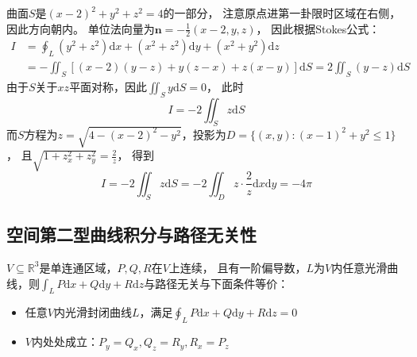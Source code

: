 \begin{solution}
  曲面$S$是$(x-2)^2 + y^2 + z^2 = 4$的一部分，
  注意原点进第一卦限时区域在右侧，因此方向朝内。
  单位法向量为$\mathbf{n} = - \frac{1}{2}(x - 2,y, z)$，
  因此根据Stokes公式：
  \begin{align*}
    I &= \oint_L(y^2 + z^2)\mathrm{d} x + (x^2 + z^2)\mathrm{d} y + (x^2 + y^2)\mathrm{d}z\\
    &= - \iint_S [(x-2)(y-z) + y(z-x) + z(x-y)]\mathrm{d}S = 2 \iint_S (y - z)\mathrm{d} S
  \end{align*}
  由于$S$关于$xz$平面对称，因此$\iint_S y\mathrm{d}S = 0$，
  此时
  \begin{equation*}
    I = -2 \iint_S z \mathrm{d}S
  \end{equation*}
  而$S$方程为$z = \sqrt{4 - (x - 2)^2 - y^2}$，投影为$D = \{(x,y): (x-1)^2 + y^2 \leq 1\}$，
  且$\sqrt{1 + z_x^2 + z_y^2 } = \frac{2}{z}$，
  得到
  \begin{equation*}
    I = -2 \iint_S z\mathrm{d}S = -2 \iint_D z \cdot \frac{2}{z} \mathrm{d}x \mathrm{d} y = -4\pi
  \end{equation*}
\end{solution}



\subsection{空间第二型曲线积分与路径无关性}

\begin{theorem}[空间第二型曲线积分与路径无关性]
  $V \subseteq \mathbb{R}^3$是单连通区域，$P,Q,R$在$V$上连续，
  且有一阶偏导数，$L$为$V$内任意光滑曲线，则$\int_L P\mathrm{d} x + Q\mathrm{d} y + R\mathrm{d} z$与路径无关与下面条件等价：
  \begin{itemize}
  \item 任意$V$内光滑封闭曲线$L$，满足$\oint _L P\mathrm{d} x + Q\mathrm{d} y + R\mathrm{d}z = 0$
  \item $V$内处处成立：$P_y = Q_x, Q_z = R_y, R_x = P_z$
  \end{itemize}
\end{theorem}







